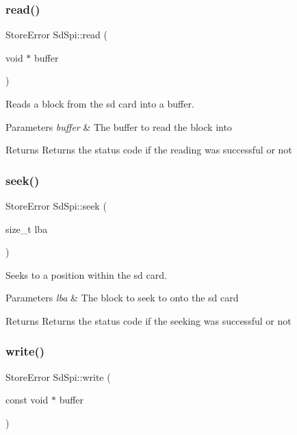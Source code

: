 \subsubsection{\texorpdfstring{read()}{read()}}
{\footnotesize\ttfamily Store\+Error Sd\+Spi\+::read (\begin{DoxyParamCaption}\item[{void $\ast$}]{buffer }\end{DoxyParamCaption})}



Reads a block from the sd card into a buffer. 


\begin{DoxyParams}{Parameters}
{\em buffer} & The buffer to read the block into \\
\hline
\end{DoxyParams}
\begin{DoxyReturn}{Returns}
Returns the status code if the reading was successful or not 
\end{DoxyReturn}
\mbox{\label{class_sd_spi_a4120c7d7ccaeba5b2726f0fca6a97e9c}} 
\subsubsection{\texorpdfstring{seek()}{seek()}}
{\footnotesize\ttfamily Store\+Error Sd\+Spi\+::seek (\begin{DoxyParamCaption}\item[{size\+\_\+t}]{lba }\end{DoxyParamCaption})}



Seeks to a position within the sd card. 


\begin{DoxyParams}{Parameters}
{\em lba} & The block to seek to onto the sd card \\
\hline
\end{DoxyParams}
\begin{DoxyReturn}{Returns}
Returns the status code if the seeking was successful or not 
\end{DoxyReturn}
\mbox{\label{class_sd_spi_ab3b314f23176ef7ed1197fb73d34f86f}} 
\subsubsection{\texorpdfstring{write()}{write()}}
{\footnotesize\ttfamily Store\+Error Sd\+Spi\+::write (\begin{DoxyParamCaption}\item[{const void $\ast$}]{buffer }\end{DoxyParamCaption})}



